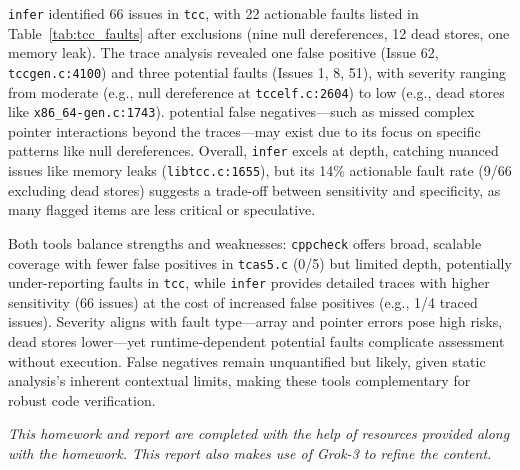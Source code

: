 \documentclass[conference]{IEEEtran}
\begin{document}
\texttt{infer} identified 66 issues in \texttt{tcc}, with 22 actionable faults listed in Table~\ref{tab:tcc_faults} after exclusions (nine null dereferences, 12 dead stores, one memory leak). The trace analysis revealed one false positive (Issue 62, \texttt{tccgen.c:4100}) and three potential faults (Issues 1, 8, 51), with severity ranging from moderate (e.g., null dereference at \texttt{tccelf.c:2604}) to low (e.g., dead stores like \texttt{x86\_64-gen.c:1743}). potential false negatives—such as missed complex pointer interactions beyond the traces—may exist due to its focus on specific patterns like null dereferences. Overall, \texttt{infer} excels at depth, catching nuanced issues like memory leaks (\texttt{libtcc.c:1655}), but its 14\% actionable fault rate (9/66 excluding dead stores) suggests a trade-off between sensitivity and specificity, as many flagged items are less critical or speculative.

Both tools balance strengths and weaknesses: \texttt{cppcheck} offers broad, scalable coverage with fewer false positives in \texttt{tcas5.c} (0/5) but limited depth, potentially under-reporting faults in \texttt{tcc}, while \texttt{infer} provides detailed traces with higher sensitivity (66 issues) at the cost of increased false positives (e.g., 1/4 traced issues). Severity aligns with fault type—array and pointer errors pose high risks, dead stores lower—yet runtime-dependent potential faults complicate assessment without execution. False negatives remain unquantified but likely, given static analysis’s inherent contextual limits, making these tools complementary for robust code verification.







\textit{This homework and report are completed with the help of resources provided along with the homework. This report also makes use of Grok-3 to refine the content.}
\end{document}
